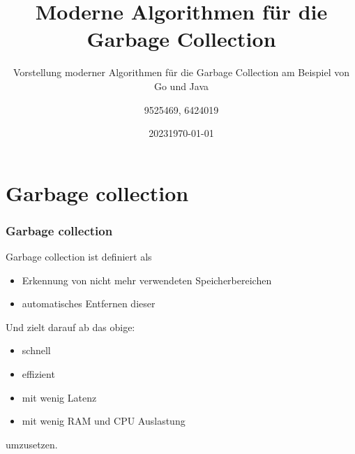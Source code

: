 \documentclass{beamer}
\title{Moderne Algorithmen für die Garbage Collection}
\subtitle{Vorstellung moderner Algorithmen für die Garbage Collection am Beispiel von Go und Java}
\date[2023]{2023}
\author{9525469, 6424019}
\institute[DHBW Mosbach]{DHBW Mosbach}
\date{\today}
\begin{document}
    
    \frame{\titlepage}
    \begin{frame}
        \tableofcontents
    \end{frame}

	\section{Garbage collection}
        \begin{frame}
            \frametitle{Garbage collection}

            Garbage collection ist definiert als

            \begin{itemize}
                \item Erkennung von nicht mehr verwendeten Speicherbereichen
                \item automatisches Entfernen dieser
            \end{itemize}

            Und zielt darauf ab das obige:

            \begin{itemize}
                \item schnell
                \item effizient
                \item mit wenig Latenz
                \item mit wenig RAM und CPU Auslastung
            \end{itemize}

            umzusetzen.
        \end{frame}
\end{document}
